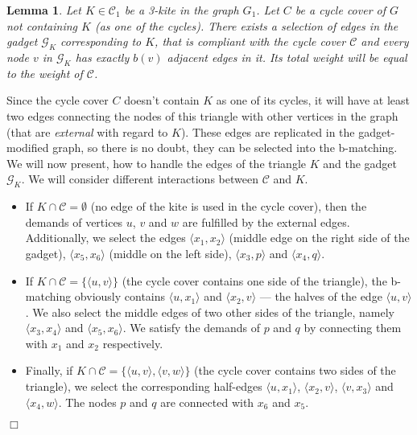 \documentclass[a4, 11pt]{article}
\newcommand{\dowod}{\noindent{\bf Proof.~}}
\newcommand{\koniec}{\hfill $\Box$\\[.1ex]}
\newcommand{\<}{\langle}
\renewcommand{\>}{\rangle}
\newtheorem{lemma}{Lemma}
\begin{document}
  \begin{lemma}
    \label{lem:maxtsp_g2compute_trikite}
    Let $K \in \mathcal{C}_1$ be a 3-kite in the graph $G_1$. Let $C$ be a cycle
    cover of $G$ not containing $K$ (as one of the cycles). There exists a selection
    of edges in the gadget $\mathcal{G}_K$ corresponding to $K$, that is
    compliant with the cycle cover $\mathcal{C}$ and every node $v$ in
    $\mathcal{G}_K$ has exactly $b(v)$ adjacent edges in it. Its total weight
    will be equal to the weight of $\mathcal{C}$.
  \end{lemma}
  \dowod
    Since the cycle cover $C$ doesn't contain $K$ as one of its cycles, it will
    have at least two edges connecting the nodes of this triangle with other
    vertices in the graph (that are \emph{external} with regard to $K$). These
    edges are replicated in the gadget-modified graph, so there is no doubt,
    they can be selected into the b-matching. We will now present, how to handle
    the edges of the triangle $K$ and the gadget $\mathcal{G}_K$. We will
    consider different interactions between $\mathcal{C}$ and $K$.
\begin{itemize}
    \item If $K \cap \mathcal{C} = \emptyset$ (no edge of the kite is used
    in the cycle cover), then the demands of vertices $u$, $v$ and $w$ are
    fulfilled by the external edges. Additionally, we select the edges $\langle
    x_1, x_2\rangle$ (middle edge on the right side of the gadget), $\langle
    x_5, x_6\rangle$ (middle on the left side), $\langle x_3, p\rangle$ and
    $\langle x_4,q\rangle$.

    \item  If $K \cap \mathcal{C} = \{\<u,v\>\}$ (the cycle cover contains
    one side of the triangle), the b-matching obviously contains $\<u,x_1\>$ and
    $\<x_2,v\>$ --- the halves of the edge $\<u,v\>$. We also select the middle
    edges of two other sides of the triangle, namely $\<x_3,x_4\>$ and
    $\<x_5,x_6\>$. We satisfy the demands of $p$ and $q$ by connecting them with
    $x_1$ and $x_2$ respectively.

    \item  Finally, if $K \cap \mathcal{C} = \{\<u,v\>,\<v,w\>\}$ (the cycle
    cover contains two sides of the triangle), we select the corresponding
    half-edges $\<u,x_1\>$, $\<x_2,v\>$, $\<v,x_3\>$ and $\<x_4,w\>$. The nodes
    $p$ and $q$ are connected with $x_6$ and $x_5$.
		
\end{itemize}		
  \koniec
\end{document}
